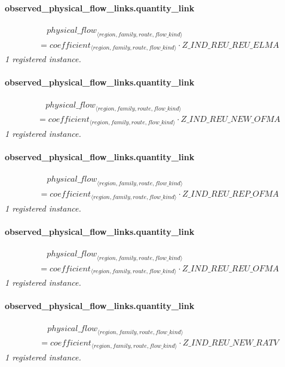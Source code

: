 \documentclass[11pt]{article}
\begin{document}
\paragraph{observed\_physical\_flow\_links.quantity\_link}
\begin{align*}
&\quad {physical\_flow}_{\langle region, family, route, flow\_kind\rangle}\\
&= coefficient_{\langle region, family, route, flow\_kind\rangle} \cdot Z\_IND\_REU\_REU\_ELMA
\end{align*}
\noindent\emph{1 registered instance.}\par
\paragraph{observed\_physical\_flow\_links.quantity\_link}
\begin{align*}
&\quad {physical\_flow}_{\langle region, family, route, flow\_kind\rangle}\\
&= coefficient_{\langle region, family, route, flow\_kind\rangle} \cdot Z\_IND\_REU\_NEW\_OFMA
\end{align*}
\noindent\emph{1 registered instance.}\par
\paragraph{observed\_physical\_flow\_links.quantity\_link}
\begin{align*}
&\quad {physical\_flow}_{\langle region, family, route, flow\_kind\rangle}\\
&= coefficient_{\langle region, family, route, flow\_kind\rangle} \cdot Z\_IND\_REU\_REP\_OFMA
\end{align*}
\noindent\emph{1 registered instance.}\par
\paragraph{observed\_physical\_flow\_links.quantity\_link}
\begin{align*}
&\quad {physical\_flow}_{\langle region, family, route, flow\_kind\rangle}\\
&= coefficient_{\langle region, family, route, flow\_kind\rangle} \cdot Z\_IND\_REU\_REU\_OFMA
\end{align*}
\noindent\emph{1 registered instance.}\par
\paragraph{observed\_physical\_flow\_links.quantity\_link}
\begin{align*}
&\quad {physical\_flow}_{\langle region, family, route, flow\_kind\rangle}\\
&= coefficient_{\langle region, family, route, flow\_kind\rangle} \cdot Z\_IND\_REU\_NEW\_RATV
\end{align*}
\noindent\emph{1 registered instance.}\par
\end{document}
